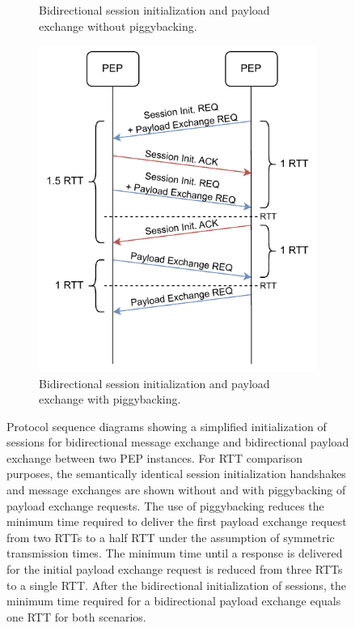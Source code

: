 \begin{description}
\begin{figure}
\begin{subfigure}[t]{0.48\linewidth}
            \caption{Bidirectional session initialization and payload exchange without piggybacking.}
            \label{fig:sabaac_accesscontrol_initialization_rtt_nopiggyback}
        \end{subfigure}
        \hfill
        \begin{subfigure}[t]{0.48\linewidth}
            \centering
            \includegraphics[width=\linewidth]{figures/SABAAC_protocols_accesscontrol_initialization_rtt_piggyback.drawio.pdf}
            \caption{Bidirectional session initialization and payload exchange with piggybacking.}
            \label{fig:sabaac_accesscontrol_initialization_rtt_piggyback}
        \end{subfigure}
        \caption{Protocol sequence diagrams showing a simplified initialization of sessions for bidirectional message exchange and bidirectional payload exchange between two PEP instances. For RTT comparison purposes, the semantically identical session initialization handshakes and message exchanges are shown without and with piggybacking of payload exchange requests. The use of piggybacking reduces the minimum time required to deliver the first payload exchange request from two RTTs to a half RTT under the assumption of symmetric transmission times. The minimum time until a response is delivered for the initial payload exchange request is reduced from three RTTs to a single RTT. After the bidirectional initialization of sessions, the minimum time required for a bidirectional payload exchange equals one RTT for both scenarios.}
        \label{fig:sabaac_accesscontrol_initialization_rtt}
    \end{figure}
\end{description}

